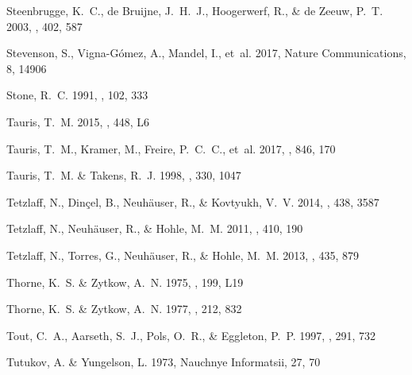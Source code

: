 \documentclass{aa}
\begin{document}
\begin{thebibliography}{242}
{Steenbrugge}, K.~C., {de Bruijne}, J.~H.~J., {Hoogerwerf}, R., \& {de Zeeuw},
  P.~T. 2003, \aap, 402, 587

{Stevenson}, S., {Vigna-G{\'o}mez}, A., {Mandel}, I., {et~al.} 2017, Nature
  Communications, 8, 14906

{Stone}, R.~C. 1991, \aj, 102, 333

{Tauris}, T.~M. 2015, \mnras, 448, L6

{Tauris}, T.~M., {Kramer}, M., {Freire}, P.~C.~C., {et~al.} 2017, \apj, 846,
  170

{Tauris}, T.~M. \& {Takens}, R.~J. 1998, \aap, 330, 1047

{Tetzlaff}, N., {Din{\c c}el}, B., {Neuh{\"a}user}, R., \& {Kovtyukh}, V.~V.
  2014, \mnras, 438, 3587

{Tetzlaff}, N., {Neuh{\"a}user}, R., \& {Hohle}, M.~M. 2011, \mnras, 410, 190

{Tetzlaff}, N., {Torres}, G., {Neuh{\"a}user}, R., \& {Hohle}, M.~M. 2013,
  \mnras, 435, 879

{Thorne}, K.~S. \& {Zytkow}, A.~N. 1975, \apjl, 199, L19

{Thorne}, K.~S. \& {Zytkow}, A.~N. 1977, \apj, 212, 832

{Tout}, C.~A., {Aarseth}, S.~J., {Pols}, O.~R., \& {Eggleton}, P.~P. 1997,
  \mnras, 291, 732

{Tutukov}, A. \& {Yungelson}, L. 1973, Nauchnye Informatsii, 27, 70


\end{thebibliography}
\end{document}
